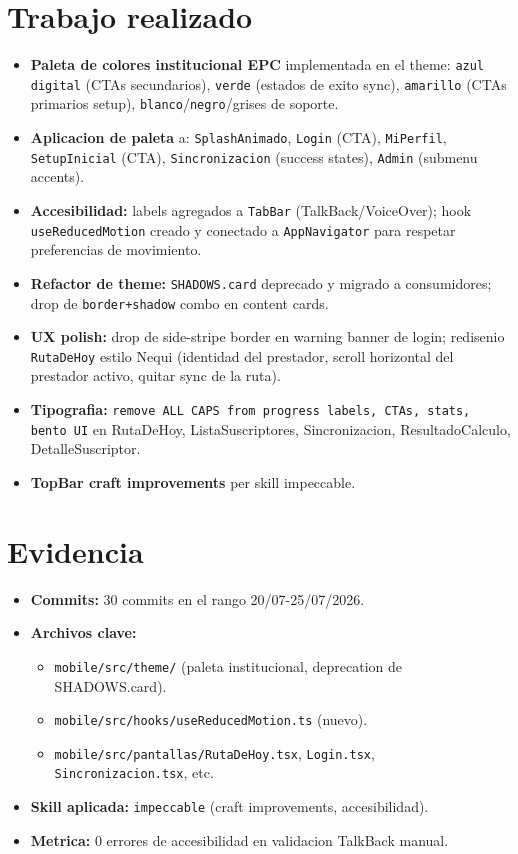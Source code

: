 \documentclass[11pt,a4paper,oneside]{report}
\begin{document}
\section{Trabajo realizado}

\begin{itemize}[leftmargin=*]
    \item \textbf{Paleta de colores institucional EPC} implementada en el theme: \texttt{azul digital} (CTAs secundarios), \texttt{verde} (estados de exito sync), \texttt{amarillo} (CTAs primarios setup), \texttt{blanco}/\texttt{negro}/grises de soporte.
    \item \textbf{Aplicacion de paleta} a: \texttt{SplashAnimado}, \texttt{Login} (CTA), \texttt{MiPerfil}, \texttt{SetupInicial} (CTA), \texttt{Sincronizacion} (success states), \texttt{Admin} (submenu accents).
    \item \textbf{Accesibilidad:} labels agregados a \texttt{TabBar} (TalkBack/VoiceOver); hook \texttt{useReducedMotion} creado y conectado a \texttt{AppNavigator} para respetar preferencias de movimiento.
    \item \textbf{Refactor de theme:} \texttt{SHADOWS.card} deprecado y migrado a consumidores; drop de \texttt{border+shadow} combo en content cards.
    \item \textbf{UX polish:} drop de side-stripe border en warning banner de login; redisenio \texttt{RutaDeHoy} estilo Nequi (identidad del prestador, scroll horizontal del prestador activo, quitar sync de la ruta).
    \item \textbf{Tipografia:} \texttt{remove ALL CAPS from progress labels, CTAs, stats, bento UI} en RutaDeHoy, ListaSuscriptores, Sincronizacion, ResultadoCalculo, DetalleSuscriptor.
    \item \textbf{TopBar craft improvements} per skill impeccable.
\end{itemize}

\section{Evidencia}

\begin{itemize}[leftmargin=*]
    \item \textbf{Commits:} 30 commits en el rango 20/07-25/07/2026.
    \item \textbf{Archivos clave:}
    \begin{itemize}
        \item \texttt{mobile/src/theme/} (paleta institucional, deprecation de SHADOWS.card).
        \item \texttt{mobile/src/hooks/useReducedMotion.ts} (nuevo).
        \item \texttt{mobile/src/pantallas/RutaDeHoy.tsx}, \texttt{Login.tsx}, \texttt{Sincronizacion.tsx}, etc.
    \end{itemize}
    \item \textbf{Skill aplicada:} \texttt{impeccable} (craft improvements, accesibilidad).
    \item \textbf{Metrica:} 0 errores de accesibilidad en validacion TalkBack manual.
\end{itemize}
\end{document}
